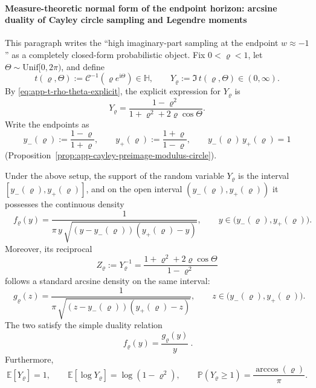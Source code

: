 \paragraph{Measure-theoretic normal form of the endpoint horizon: arcsine duality of Cayley circle sampling and Legendre moments}\label{par:app-endpoint-arcsine-legendre}
This paragraph writes the ``high imaginary-part sampling at the endpoint \(w\approx-1\)'' as a completely closed-form probabilistic object.
Fix \(0<\varrho<1\), let \(\Theta\sim\mathrm{Unif}[0,2\pi)\), and define
\[
t(\varrho,\Theta):=\mathcal{C}^{-1}(\varrho e^{\mathrm{i}\Theta})\in\mathbb{H},
\qquad
Y_{\varrho}:=\Im\,t(\varrho,\Theta)\in(0,\infty).
\]
By \eqref{eq:app-t-rho-theta-explicit}, the explicit expression for \(Y_{\varrho}\) is
\[
Y_{\varrho}
=\frac{1-\varrho^2}{1+\varrho^2+2\varrho\cos\Theta}.
\]
Write the endpoints as
\[
y_{-}(\varrho):=\frac{1-\varrho}{1+\varrho},
\qquad
y_{+}(\varrho):=\frac{1+\varrho}{1-\varrho},
\qquad
y_{-}(\varrho)\,y_{+}(\varrho)=1
\]
(Proposition~\ref{prop:app-cayley-preimage-modulus-circle}).

\begin{theorem}\label{thm:app-endpoint-arcsine-duality}
Under the above setup, the support of the random variable \(Y_{\varrho}\) is the interval \([y_{-}(\varrho),y_{+}(\varrho)]\), and on the open interval \((y_{-}(\varrho),y_{+}(\varrho))\) it possesses the continuous density
\begin{equation}\label{eq:app-endpoint-y-density-tilted-arcsine}
\boxed{\quad
f_{\varrho}(y)
=\frac{1}{\pi\,y\,\sqrt{(y-y_{-}(\varrho))(y_{+}(\varrho)-y)}},
\qquad y\in\bigl(y_{-}(\varrho),y_{+}(\varrho)\bigr).
\quad}
\end{equation}
Moreover, its reciprocal
\[
Z_{\varrho}:=Y_{\varrho}^{-1}
=\frac{1+\varrho^2+2\varrho\cos\Theta}{1-\varrho^2}
\]
follows a standard arcsine density on the same interval:
\begin{equation}\label{eq:app-endpoint-z-density-arcsine}
\boxed{\quad
g_{\varrho}(z)
=\frac{1}{\pi\,\sqrt{(z-y_{-}(\varrho))(y_{+}(\varrho)-z)}},
\qquad z\in\bigl(y_{-}(\varrho),y_{+}(\varrho)\bigr).
\quad}
\end{equation}
The two satisfy the simple duality relation
\[
\boxed{\ f_{\varrho}(y)=\frac{g_{\varrho}(y)}{y}\ }.
\]
Furthermore,
\[
\mathbb{E}[Y_{\varrho}]=1,
\qquad
\mathbb{E}[\log Y_{\varrho}]=\log(1-\varrho^{2}),
\qquad
\mathbb{P}(Y_{\varrho}\ge 1)=\frac{\arccos(\varrho)}{\pi}.
\]
\end{theorem}

